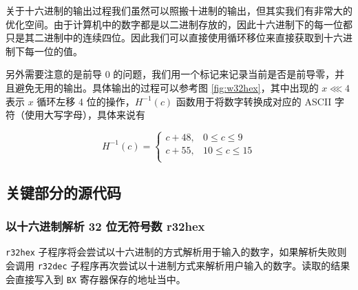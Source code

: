 关于十六进制的输出过程我们虽然可以照搬十进制的输出，但其实我们有非常大的优化空间。由于计算机中的数字都是以二进制存放的，因此十六进制下的每一位都只是其二进制中的连续四位。因此我们可以直接使用循环移位来直接获取到十六进制下每一位的值。

另外需要注意的是前导 0 的问题，我们用一个标记来记录当前是否是前导零，并且避免无用的输出。具体输出的过程可以参考图 \ref{fig:w32hex}，其中出现的 $x \lll 4$ 表示 $x$ 循环左移 4 位的操作，$H^{-1}(c)$ 函数用于将数字转换成对应的 ASCII 字符（使用大写字母），具体来说有

$$
H^{-1}(c) = \begin{cases}
  c + 48, &0 \le c \le 9 \\
  c + 55, &10 \le c \le 15 \\
\end{cases}
$$

\subsection{关键部分的源代码}

\subsubsection{以十六进制解析 32 位无符号数 r32hex}

\verb|r32hex| 子程序将会尝试以十六进制的方式解析用于输入的数字，如果解析失败则会调用 \verb|r32dec| 子程序再次尝试以十进制方式来解析用户输入的数字。读取的结果会直接写入到 \verb|BX| 寄存器保存的地址当中。

